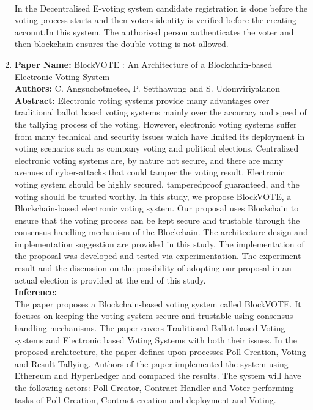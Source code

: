 \documentclass[oneside, 12pt]{book}
\begin{document}
\begin{enumerate}
	      \\In the Decentralised E-voting system candidate registration is done before the voting process starts and then voters identity is verified before the creating account.In this system. The authorised person authenticates the voter and then blockchain ensures the double voting is not allowed.
	\item
	      \textbf{Paper Name:} BlockVOTE : An Architecture of a Blockchain-based Electronic Voting System \cite{angsuchotmetee2019blockvote}\\
	      \textbf{Authors:} C. Angsuchotmetee, P. Setthawong and S. Udomviriyalanon\\
	      \textbf{Abstract:} Electronic voting systems provide many advantages over traditional ballot based voting systems mainly over the accuracy and speed of the tallying process of the voting. However, electronic voting systems suffer from many technical and security issues which have limited its deployment in voting scenarios such as company voting and political elections. Centralized electronic voting systems are, by nature not secure, and there are many avenues of cyber-attacks that could tamper the voting result. Electronic voting system should be highly secured, tamperedproof guaranteed, and the voting should be trusted worthy. In this study, we propose BlockVOTE, a Blockchain-based electronic voting system. Our proposal uses Blockchain to ensure that the voting process can be kept secure and trustable through the consensus handling mechanism of the Blockchain. The architecture design and implementation suggestion are provided in this study. The implementation of the proposal was developed and tested via experimentation. The experiment result and the discussion on the possibility of adopting our proposal in an actual election is provided at the end of this study.\\
	      \textbf{Inference:}
	      \\The paper proposes a Blockchain-based voting system called BlockVOTE. It focuses on keeping the voting system secure and trustable using consensus handling mechanisms. The paper covers Traditional Ballot based Voting systems and Electronic based Voting Systems with both their issues. In the proposed architecture, the paper defines upon processes Poll Creation, Voting and Result Tallying. Authors of the paper implemented the system using Ethereum and HyperLedger and compared the results. The system will have the following actors: Poll Creator, Contract Handler and Voter performing tasks of Poll Creation, Contract creation and deployment and Voting.

\end{enumerate}
\end{document}
